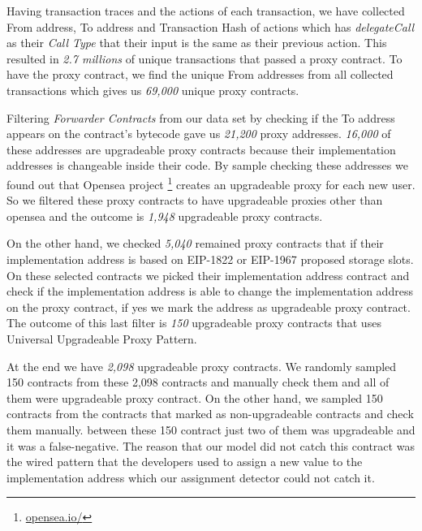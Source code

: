 Having transaction traces and the actions of each transaction, we have collected From address, To address and Transaction Hash of actions which has \textit{delegateCall} as their \textit{Call Type} that their input is the same as their previous action. This resulted in \textit{2.7 millions} of unique transactions that passed a proxy contract.
To have the proxy contract, we find the unique From addresses from all collected transactions which gives us \textit{69,000} unique proxy contracts. 

Filtering \textit{Forwarder Contracts} from our data set by checking if the To address appears on the contract's bytecode gave us \textit{21,200} proxy addresses. \textit{16,000} of these addresses are upgradeable proxy contracts because their implementation addresses is changeable inside their code. By sample checking these addresses we found out that Opensea project \footnote{\url{opensea.io/}} creates an upgradeable proxy for each new user. So we filtered these proxy contracts to have upgradeable proxies other than opensea and the outcome is \textit{1,948} upgradeable proxy contracts. 

On the other hand, we checked \textit{5,040} remained proxy contracts that if their implementation address is based on EIP-1822 or EIP-1967 proposed storage slots. On these selected contracts we picked their implementation address contract and check if the implementation address is able to change the implementation address on the proxy contract, if yes we mark the address as upgradeable proxy contract. The outcome of this last filter is \textit{150} upgradeable proxy contracts that uses Universal Upgradeable Proxy Pattern. 

At the end we have \textit{2,098} upgradeable proxy contracts. We randomly sampled 150 contracts from these 2,098 contracts and manually check them and all of them were upgradeable proxy contract. On the other hand, we sampled 150 contracts from the contracts that marked as non-upgradeable contracts and check them manually. between these 150 contract just two of them was upgradeable and it was a false-negative. The reason that our model did not catch this contract was the wired pattern that the developers used to assign a new value to the implementation address which our assignment detector could not catch it. 



